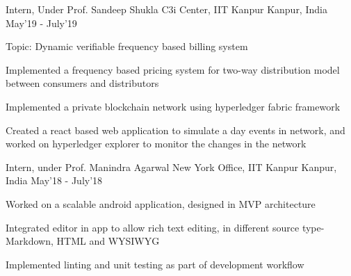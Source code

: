 \begin{cventries}
    \cventry
  {Intern, Under Prof. Sandeep Shukla}
  {C3i Center, IIT Kanpur}
  {Kanpur, India}
  {May'19 - July'19}
  {
    \begin{cvitems}
    	  \item {Topic: Dynamic verifiable frequency based billing system}
          \item {Implemented a frequency based pricing system for two-way distribution model between consumers and distributors}
          \item {Implemented a private blockchain network using hyperledger fabric framework}
          \item {Created a react based web application to simulate a day events in network, and worked on hyperledger explorer to monitor the changes in the network}
    \end{cvitems}
  }
  

  \cventry
  {Intern, under Prof. Manindra Agarwal}
  {New York Office, IIT Kanpur}
  {Kanpur, India}
  {May'18 - July'18}
  {
    \begin{cvitems}
          \item {Worked on a scalable android application, designed in MVP architecture}
          \item {Integrated editor in app to allow rich text editing, in different source type- Markdown, HTML and WYSIWYG}
          \item{Implemented linting and unit testing as part of development workflow}
    \end{cvitems}
  }

\end{cventries}
